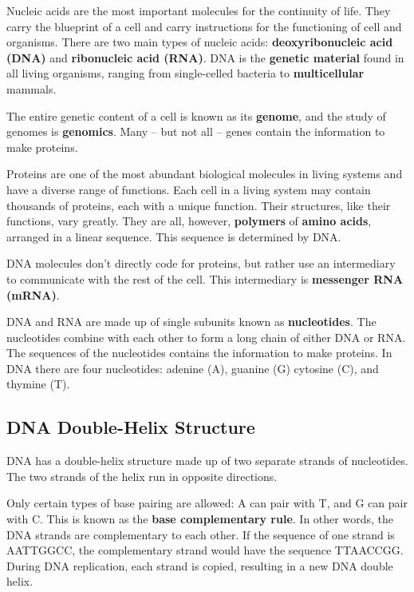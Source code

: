 \documentclass[
]{book}
\begin{document}
Nucleic acids are the most important molecules for the continuity of
life. They carry the blueprint of a cell and carry instructions for the
functioning of cell and organisms. There are two main types of nucleic
acids: \textbf{deoxyribonucleic acid (DNA)} and \textbf{ribonucleic acid (RNA)}.
DNA is the \textbf{genetic material} found in all living organisms, ranging
from single-celled bacteria to \textbf{multicellular} mammals.

The entire genetic content of a cell is known as its \textbf{genome}, and the
study of genomes is \textbf{genomics}. Many -- but not all -- genes contain
the information to make proteins.

Proteins are one of the most abundant biological molecules in living
systems and have a diverse range of functions. Each cell in a living
system may contain thousands of proteins, each with a unique function.
Their structures, like their functions, vary greatly. They are all,
however, \textbf{polymers} of \textbf{amino acids}, arranged in a linear sequence.
This sequence is determined by DNA.

DNA molecules don't directly code for proteins, but rather use an
intermediary to communicate with the rest of the cell. This intermediary
is \textbf{messenger RNA (mRNA)}.

DNA and RNA are made up of single subunits known as \textbf{nucleotides}. The
nucleotides combine with each other to form a long chain of either DNA
or RNA. The sequences of the nucleotides contains the information to
make proteins. In DNA there are four nucleotides: adenine (A), guanine
(G) cytosine (C), and thymine (T).

\hypertarget{dna-double-helix-structure}{%
\subsection{DNA Double-Helix Structure}\label{dna-double-helix-structure}}

DNA has a double-helix structure made up of two separate strands of
nucleotides. The two strands of the helix run in opposite directions.

Only certain types of base pairing are allowed: A can pair with T, and G
can pair with C. This is known as the \textbf{base complementary rule}. In
other words, the DNA strands are complementary to each other. If the
sequence of one strand is AATTGGCC, the complementary strand would have
the sequence TTAACCGG. During DNA replication, each strand is copied,
resulting in a new DNA double helix.
\end{document}
